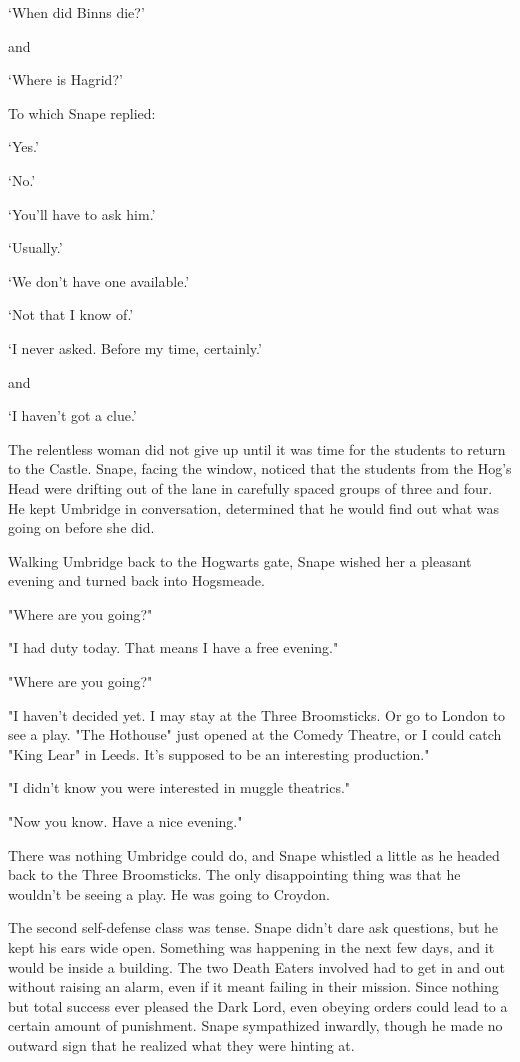 `When did Binns die?'

and

`Where is Hagrid?'

To which Snape replied:

`Yes.'

`No.'

`You'll have to ask him.'

`Usually.'

`We don't have one available.'

`Not that I know of.'

`I never asked. Before my time, certainly.'

and

`I haven't got a clue.'

The relentless woman did not give up until it was time for the students to return to the Castle. Snape, facing the window, noticed that the students from the Hog's Head were drifting out of the lane in carefully spaced groups of three and four. He kept Umbridge in conversation, determined that he would find out what was going on before she did.

Walking Umbridge back to the Hogwarts gate, Snape wished her a pleasant evening and turned back into Hogsmeade.

"Where are you going?"

"I had duty today. That means I have a free evening."

"Where are you going?"

"I haven't decided yet. I may stay at the Three Broomsticks. Or go to London to see a play. "The Hothouse" just opened at the Comedy Theatre, or I could catch "King Lear" in Leeds. It's supposed to be an interesting production."

"I didn't know you were interested in muggle theatrics."

"Now you know. Have a nice evening."

There was nothing Umbridge could do, and Snape whistled a little as he headed back to the Three Broomsticks. The only disappointing thing was that he wouldn't be seeing a play. He was going to Croydon.

The second self-defense class was tense. Snape didn't dare ask questions, but he kept his ears wide open. Something was happening in the next few days, and it would be inside a building. The two Death Eaters involved had to get in and out without raising an alarm, even if it meant failing in their mission. Since nothing but total success ever pleased the Dark Lord, even obeying orders could lead to a certain amount of punishment. Snape sympathized inwardly, though he made no outward sign that he realized what they were hinting at.

